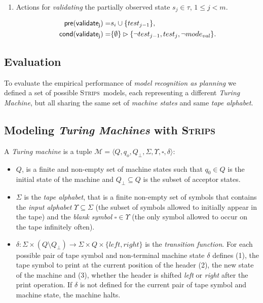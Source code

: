 \documentclass[letterpaper]{article} %
\newcommand{\tup}[1]{{\langle #1 \rangle}}
\newcommand{\pre}{\mathsf{pre}}     %
\newcommand{\cond}{\mathsf{cond}}   %
\newcommand{\strips}{\textsc{Strips}}     %
\begin{document}
\begin{itemize}
\begin{enumerate}
\item Actions for {\em validating} the partially observed state $s_j\in\tau$, {\tt\small $1\leq j< m$}.
\begin{small}
\begin{align*}
\hspace*{7pt}\pre(\mathsf{validate_{j}})=&s_i\cup\{test_{j-1}\},\\
\cond(\mathsf{validate_{j}})=&\{\emptyset\}\rhd\{\neg test_{j-1}, test_j,\neg mode_{val}\}.
\end{align*}
\end{small}
\end{enumerate}
\end{itemize}


\subsection{Evaluation}
\label{sec:evaluation}
To evaluate the empirical performance of {\em model recognition as planning} we defined a set of possible \strips\ models, each representing a different {\em Turing Machine}, but all sharing the same set of {\em machine states} and same {\em tape alphabet}.

\subsection{Modeling {\em Turing Machines} with \strips\ }
A {\em Turing machine} is a tuple $\mathcal{M}=\tup{Q,q_o,Q_{\bot},\Sigma,\Upsilon,\square,\delta}$:
\begin{itemize}
\item $Q$, is a finite and non-empty set of machine states such that $q_0\in Q$ is the initial state of the machine and $Q_{\bot}\subseteq Q$ is the subset of acceptor states.  
\item $\Sigma$ is the {\em tape alphabet}, that is a finite non-empty set of symbols that contains the {\em input alphabet} $\Upsilon\subseteq\Sigma$ (the subset of symbols allowed to initially appear in the tape) and the {\em blank symbol} $\square\in\Upsilon$ (the only symbol allowed to occur on the tape infinitely often).
\item $\delta: \Sigma\times (Q\setminus Q_{\bot}) \rightarrow \Sigma\times Q\times\{left,right\}$ is the {\em transition function}. For each possible pair of tape symbol and non-terminal machine state $\delta$ defines (1), the tape symbol to print at the current position of the header (2), the new state of the machine and (3), whether the header is shifted {\em left} or {\em right} after the print operation. If $\delta$ is not defined for the current pair of tape symbol and machine state, the machine halts.
\end{itemize}
\end{document}
